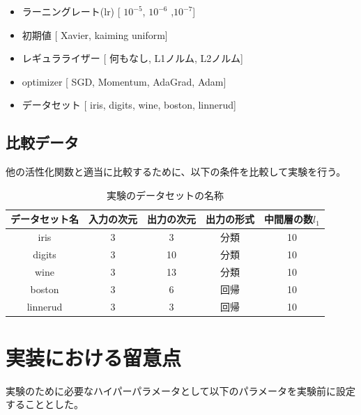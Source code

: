 \begin{itemize}
\label{exp_list}
    \setlength{\parskip}{0cm} %
    \setlength{\itemsep}{0cm} %
    \item ラーニングレート(lr) [ $10^{-5}$, $10^{-6}$ ,$10^{-7}$]
    \item 初期値 [ Xavier, kaiming uniform]
    \item レギュラライザー [ 何もなし, L1ノルム, L2ノルム]
    \item optimizer [ SGD, Momentum, AdaGrad, Adam]
    \item データセット [ iris, digits, wine, boston, linnerud]
\end{itemize}



\subsection{比較データ}

他の活性化関数と適当に比較するために、以下の条件を比較して実験を行う。


\begin{table}[htbp]
    \begin{center}
        \caption{実験のデータセットの名称}
        \vspace{5mm} 
        \begin{tabular}{ |c|c|c|c|c| }
        データセット名 & 入力の次元 & 出力の次元 & 出力の形式 & 中間層の数$ {l_1} $\\
        \hline
        iris         & 3         & 3        & 分類      & 10 \\
        digits       & 3         & 10       & 分類      & 10 \\
        wine        & 3         & 13       & 分類      & 10 \\
        boston       & 3         & 6        & 回帰      & 10 \\
        linnerud     & 3         & 3        & 回帰      & 10 \\
        \end{tabular}
    \end{center}
\end{table}


\section{実装における留意点}
実験のために必要なハイパーパラメータとして以下のパラメータを実験前に設定することとした。

